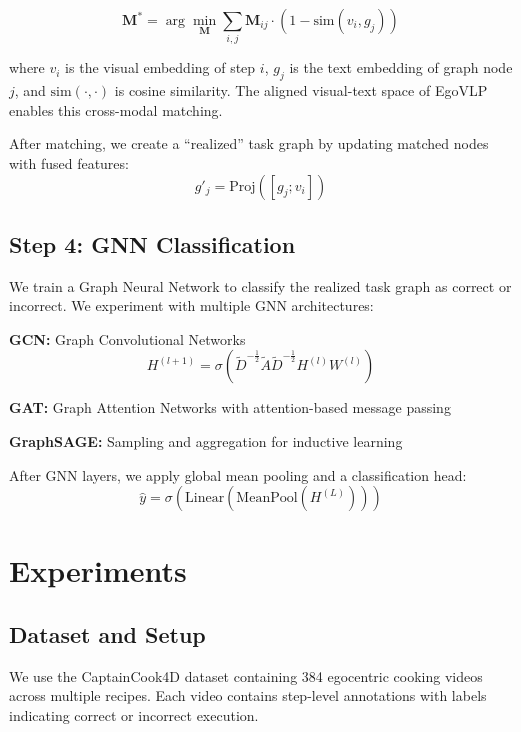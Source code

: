 \documentclass[10pt,twocolumn,letterpaper]{article}
\begin{document}
\begin{equation}
\mathbf{M}^* = \arg\min_{\mathbf{M}} \sum_{i,j} \mathbf{M}_{ij} \cdot (1 - \text{sim}(v_i, g_j))
\end{equation}

where $v_i$ is the visual embedding of step $i$, $g_j$ is the text embedding of graph node $j$, and $\text{sim}(\cdot, \cdot)$ is cosine similarity. The aligned visual-text space of EgoVLP enables this cross-modal matching.

After matching, we create a ``realized'' task graph by updating matched nodes with fused features:
\begin{equation}
g'_j = \text{Proj}([g_j; v_i])
\end{equation}

\subsection{Step 4: GNN Classification}

We train a Graph Neural Network to classify the realized task graph as correct or incorrect. We experiment with multiple GNN architectures:

\textbf{GCN:} Graph Convolutional Networks \cite{kipf2017gcn}
\begin{equation}
H^{(l+1)} = \sigma(\tilde{D}^{-\frac{1}{2}}\tilde{A}\tilde{D}^{-\frac{1}{2}}H^{(l)}W^{(l)})
\end{equation}

\textbf{GAT:} Graph Attention Networks \cite{velickovic2018gat} with attention-based message passing

\textbf{GraphSAGE:} Sampling and aggregation for inductive learning \cite{hamilton2017graphsage}

After GNN layers, we apply global mean pooling and a classification head:
\begin{equation}
\hat{y} = \sigma(\text{Linear}(\text{MeanPool}(H^{(L)})))
\end{equation}

\section{Experiments}

\subsection{Dataset and Setup}

We use the CaptainCook4D dataset \cite{peddi2024captaincook4d} containing 384 egocentric cooking videos across multiple recipes. Each video contains step-level annotations with labels indicating correct or incorrect execution.
\end{document}
